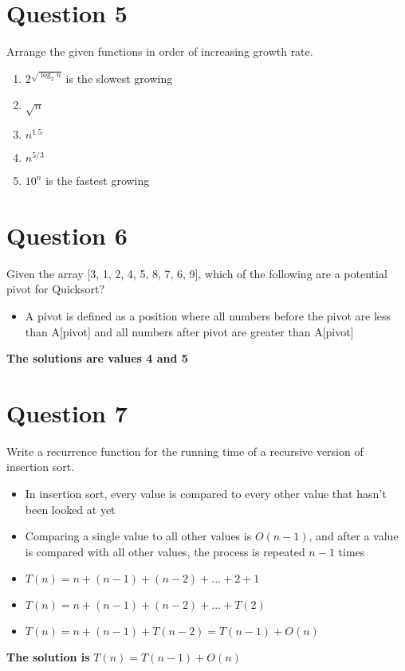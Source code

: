 \documentclass{article}
\begin{document}
    \section{Question 5}
    Arrange the given functions in order of increasing growth rate.
        \begin{enumerate}
            \item{$2^{\sqrt{\log_2 n}}$ is the slowest growing}
            \item{$\sqrt n$}
            \item{$n^{1.5}$}
            \item{$n^{5/3}$}
            \item{$10^n$ is the fastest growing}
        \end{enumerate}

    \section{Question 6}
    Given the array [3, 1, 2, 4, 5, 8, 7, 6, 9], which of the following are a potential pivot for Quicksort?
        \begin{itemize}
            \item{A pivot is defined as a position where all numbers before the pivot are less than A[pivot] and all numbers after pivot are greater than A[pivot]}
        \end{itemize}
    \textbf{The solutions are values 4 and 5}

    \section{Question 7}
    Write a recurrence function for the running time of a recursive version of insertion sort.
    	\begin{itemize}
    		\item{In insertion sort, every value is compared to every other value that hasn't been looked at yet}
    		\item{Comparing a single value to all other values is $O(n - 1)$, and after a value is compared with all other values, the process is repeated $n-1$ times}
    		\item{$T(n) = n + (n - 1) + (n - 2) + ... + 2 + 1$}
    		\item{$T(n) = n + (n - 1) + (n-2) + ... + T(2)$}
    		\item{$T(n) = n + (n - 1) + T(n-2) = T(n-1) + O(n)$}
		\end{itemize}
    \textbf{The solution is} $T(n) = T(n-1) + O(n)$
\end{document}
